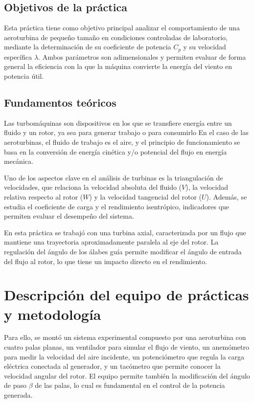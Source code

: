\documentclass[10pt]{IEEEtran}
\begin{document}
\subsection{Objetivos de la práctica}
Esta práctica tiene como objetivo principal analizar el comportamiento de una aeroturbina de pequeño tamaño en condiciones controladas de laboratorio, mediante la determinación de su coeficiente de potencia $C_p$ y su velocidad específica $\lambda$. Ambos parámetros son adimensionales y permiten evaluar de forma general la eficiencia con la que la máquina convierte la energía del viento en potencia útil.

\subsection{Fundamentos teóricos}
Las turbomáquinas son dispositivos en los que se transfiere energía entre un fluido y un rotor, ya sea para generar trabajo o para consumirlo En el caso de las aeroturbinas, el fluido de trabajo es el aire, y el principio de funcionamiento se basa en la conversión de energía cinética y/o potencial del flujo en energía mecánica.

Uno de los aspectos clave en el análisis de turbinas es la triangulación de velocidades, que relaciona la velocidad absoluta del fluido ($V$), la velocidad relativa respecto al rotor ($W$) y la velocidad tangencial del rotor ($U$). Además, se estudia el coeficiente de carga y el rendimiento isentrópico, indicadores que permiten evaluar el desempeño del sistema.

En esta práctica se trabajó con una turbina axial, caracterizada por un flujo que mantiene una trayectoria aproximadamente paralela al eje del rotor. La regulación del ángulo de los álabes guía permite modificar el ángulo de entrada del flujo al rotor, lo que tiene un impacto directo en el rendimiento.

\section{Descripción del equipo de prácticas y metodología}

Para ello, se montó un sistema experimental compuesto por una aeroturbina con cuatro palas planas, un ventilador para simular el flujo de viento, un anemómetro para medir la velocidad del aire incidente, un potenciómetro que regula la carga eléctrica conectada al generador, y un tacómetro que permite conocer la velocidad angular del rotor. El equipo permite también la modificación del ángulo de paso $\beta$ de las palas, lo cual es fundamental en el control de la potencia generada.
\end{document}
